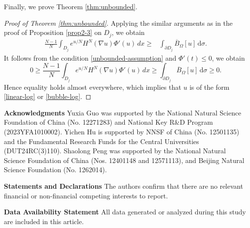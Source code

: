 \documentclass[reqno, 11pt]{amsart} %
\numberwithin{equation}{section}
\theoremstyle{definition}
\newcommand{\pa}{\partial}
\begin{document}
Finally, we prove Theorem \ref{thm:unbounded}.
\begin{proof}[Proof of Theorem \ref{thm:unbounded}]
Applying the similar arguments as  in the proof of  Proposition \ref{prop2-3} on $D_j$, we obtain
\begin{align*}
    \frac{N-1}{N}\int_{D_j} e^{u/N}H^N(\nabla u)\Phi'(u)\,dx \ge & \int_{\pa D_j} \overline{B}_{\Omega}[u] \, \text{d} \sigma .
\end{align*}
It follows from the condition \eqref{unbounded-assumption} and $\Phi'(t) \leq 0$, we obtain
\[
    0 \ge \frac{N-1}{N}\int_{D_j} e^{u/N}H^N(\nabla u)\Phi'(u)\,dx  \geq \int_{\pa D_j} \overline{B}_{\Omega}[u] \, \text{d} \sigma \ge0.
\]
Hence equality holds almost everywhere, which implies that $u$ is of the form \eqref{linear-log} or \eqref{bubble-log}.
\end{proof}




\textbf{Acknowledgments} Yuxia Guo was supported by the National Natural Science Foundation of China (No. 12271283) and National Key R\&D Program (2023YFA1010002). Yichen Hu is supported by NNSF of China (No. 12501135) and the Fundamental Research Funds for the Central Universities (DUT24RC(3)110). Shaolong Peng was supported by the National Natural Science Foundation of China (Nos. 12401148 and 12571113), and Beijing Natural Science Foundation (No. 1262014).

\textbf{Statements and Declarations}
The authors confirm that there are no relevant financial or non-financial competing interests to report.

\textbf{Data Availability Statement}
All data generated or analyzed during this study are included in this article.
\end{document}
